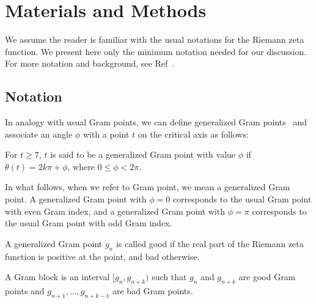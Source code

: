 \documentclass[twoside]{article}
\begin{document}
\section{\label{sec2}Materials and Methods}
We assume the reader is familiar with the usual notations for the Riemann zeta function.  We present here only the minimum notation needed for our discussion. For more notation and background,  see Ref~\cite{Shanker 2018a}.


\subsection{\label{seckaratsuba}Notation}
In analogy with usual Gram points, we can define generalized Gram points~\cite{Shanker 2018b}  and
associate an angle $\phi$ with a point $t$ on the critical axis as follows:
\begin{definition}\label{phi}
For $t \ge 7$, $t$ is said to be a generalized Gram point with value $\phi$  if
$\theta (t) = 2k\pi + \phi$, where $0 \le \phi < 2\pi$.
\end{definition}
In what follows, when we refer to Gram point, we mean a generalized Gram point.  A generalized Gram point with $\phi=0$ corresponds to the usual Gram point with even Gram index,
and a  generalized Gram point with $\phi=\pi$ corresponds to the usual Gram point with odd Gram index.
\begin{definition}\label{good1}
A generalized Gram point $g_n$ is called good if the real part of the Riemann zeta function is positive at the  point, and bad otherwise.
\end{definition}

\begin{definition}\label{gramblock}
A Gram block is an interval $[g_n, g_{n+k})$ such that $g_n$  and $g_{n+k}$ are good Gram points 
and $g_{n+1}, . . ., g_{n+k-1}$ are bad Gram points. 
\end{definition}
\end{document}

